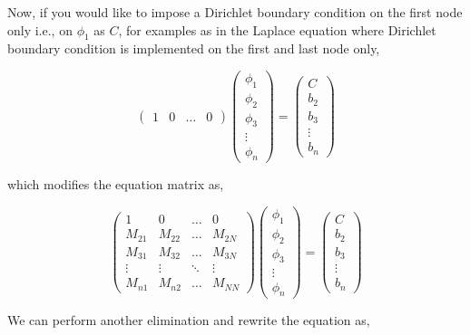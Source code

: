 Now, if you would like to impose a Dirichlet boundary condition on the first node only i.e., on $\phi_1$ as $C$, for examples as in the 
Laplace equation where Dirichlet boundary condition is implemented on the first and last node only,  


\[ \left( \begin{array}{cccc}
1 & 0 & \hdots& 0
 \end{array} \right) \left( \begin{array}{c}
\phi_{1} \\
\phi_{2} \\
\phi_{3} \\
 \vdots\\ 
\phi_{n} \end{array} \right) = \left( \begin{array}{c}
C \\
b_{2} \\
b_{3} \\
 \vdots\\
b_{n} \end{array} \right) \] 

which modifies the equation matrix as,

\[ \left( \begin{array}{cccc}
1 & 0 & \hdots& 0 \\
M_{21} & M_{22} & \hdots& M_{2N} \\
M_{31} & M_{32} & \hdots& M_{3N} \\
\vdots& \vdots& \ddots& \vdots\\
M_{n1} & M_{n2} & \hdots & M_{NN} \end{array} \right) \left( \begin{array}{c}
\phi_{1} \\
\phi_{2} \\
\phi_{3} \\
 \vdots\\ 
\phi_{n} \end{array} \right) = \left( \begin{array}{c}
C \\
b_{2} \\
b_{3} \\
 \vdots\\
b_{n} \end{array} \right) \] 


We can perform another elimination and rewrite the equation as,  

